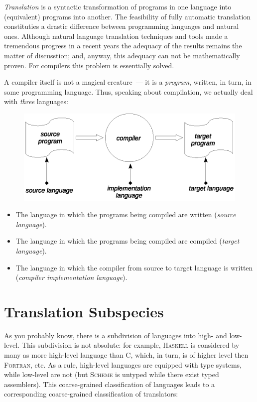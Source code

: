 \documentclass{article}
\begin{document}
\emph{Translation} is a syntactic transformation of programs in one language into (equivalent) programs into another.
The feasibility of fully automatic translation constituties a drastic difference between programming languages and natural ones.
Although natural language translation techniques and tools made a tremendous progress in a recent years the adequacy of the results
remains the matter of discusstion; and, anyway, this adequacy can not be mathematically proven. For compilers this problem
is essentially solved.

A compiler itself is not a magical creature~--- it is a \emph{program}, written, in turn, in some programming language. Thus, speaking
about compilation, we actually deal with \emph{three} languages:

\begin{figure}[h]
  \centering
  \includegraphics[scale=0.7]{images/01-04.eps}
\end{figure}

\begin{itemize}
\item The language in which the programs being compiled are written (\emph{source language}).
\item The language in which the programs being compiled are compiled (\emph{target language}).
\item The language in which the compiler from source to target language is written (\emph{compiler implementation language}).
\end{itemize}

\section{Translation Subspecies}

As you probably know, there is a subdivision of languages into high- and low-level. This subdivision is not absolute: for example,
\textsc{Haskell} is considered by many as more high-level language than \textsc{C}, which, in turn, is of higher level then \textsc{Fortran}, etc.
As a rule, high-level languages are equipped with type systems, while low-level are not (but \textsc{Scheme} is untyped while there 
exist typed assemblers). This coarse-grained classification of languages leads to a corresponding coarse-grained classification of
translators:
\end{document}
